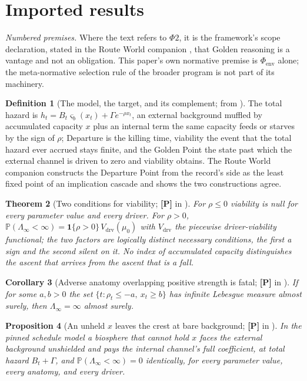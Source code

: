 \documentclass[11pt]{article}
\newcommand{\PP}{\mathbb{P}}
\newcommand{\one}{\mathbf{1}}
\theoremstyle{plain}
\newtheorem{theorem}{Theorem}[section]
\newtheorem{proposition}[theorem]{Proposition}
\newtheorem{corollary}[theorem]{Corollary}
\theoremstyle{definition}
\newtheorem{definition}[theorem]{Definition}
\theoremstyle{remark}
\begin{document}
\section{Imported results}\label{sec:imports}

\noindent\emph{Numbered premises.} Where the text refers to $\Phi2$,
it is the framework's scope declaration, stated in the Route World
companion \cite{RouteWorld}, that Golden reasoning is a vantage and not
an obligation. This paper's own normative premise is
$\Phi_{\mathrm{env}}$ alone; the meta-normative selection rule of the
broader program is not part of its machinery.


\begin{definition}[The model, the target, and its complement; from
\cite{SurvA,RouteWorld}]\label{imp:model}
The total hazard is $h_t=B_t\varsigma_b(x_t)+\Gamma e^{-\rho x_t}$, an
external background muffled by accumulated capacity $x$ plus an
internal term the same capacity feeds or starves by the sign of $\rho$;
Departure is the killing time, viability the event that the total
hazard ever accrued stays finite, and the Golden Point the state past
which the external channel is driven to zero and viability obtains. The
Route World companion constructs the Departure Point from the record's
side as the least fixed point of an implication cascade and shows the
two constructions agree.
\end{definition}

\begin{theorem}[Two conditions for viability; \textbf{[P]} in \cite{SurvA}]
\label{imp:twocond}
For $\rho\le0$ viability is null for every parameter value and every
driver. For $\rho>0$, $\PP(\Lambda_\infty<\infty)=\one\{\rho>0\}\,V_{\mathrm{drv}}(\mu_0)$
with $V_{\mathrm{drv}}$ the piecewise driver-viability functional; the
two factors are logically distinct necessary conditions, the first a
sign and the second silent on it. No index of accumulated capacity
distinguishes the ascent that arrives from the ascent that is a fall.
\end{theorem}

\begin{corollary}[Adverse anatomy overlapping positive strength is
fatal; \textbf{[P]} in \cite{SurvA}]\label{imp:overlap}
If for some $a,b>0$ the set $\{t:\rho_t\le-a,\ x_t\ge b\}$ has infinite
Lebesgue measure almost surely, then $\Lambda_\infty=\infty$ almost
surely.
\end{corollary}

\begin{proposition}[An unheld $x$ leaves the crest at bare background;
\textbf{[P]} in \cite{TechnoC}]\label{imp:gating}
In the pinned schedule model a biosphere that cannot hold $x$ faces the
external background unshielded and pays the internal channel's full
coefficient, at total hazard $B_t+\Gamma$, and $\PP(\Lambda_\infty<\infty)=0$
identically, for every parameter value, every anatomy, and every
driver.
\end{proposition}
\end{document}
